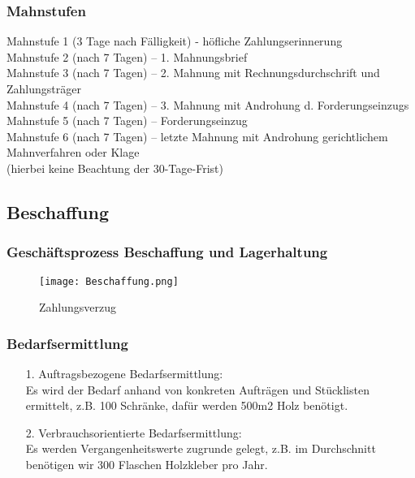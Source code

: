 \documentclass[asp1.tex]{subfiles}
\begin{document}
\subsubsection{Mahnstufen}
Mahnstufe 1 (3 Tage nach Fälligkeit) - höfliche Zahlungserinnerung\\
Mahnstufe 2 (nach 7 Tagen) – 1. Mahnungsbrief\\
Mahnstufe 3 (nach 7 Tagen) – 2. Mahnung mit Rechnungsdurchschrift und Zahlungsträger\\
Mahnstufe 4 (nach 7 Tagen) – 3. Mahnung mit Androhung d. Forderungseinzugs\\
Mahnstufe 5 (nach 7 Tagen) – Forderungseinzug\\
Mahnstufe 6 (nach 7 Tagen) – letzte Mahnung mit Androhung gerichtlichem\\
Mahnverfahren oder Klage\\
(hierbei keine Beachtung der 30-Tage-Frist)\\\textbf{}

\subsection{Beschaffung}
\subsubsection {Geschäftsprozess Beschaffung und Lagerhaltung}
\begin{figure}[H]
    \begin{center}
        \texttt{[image: Beschaffung.png]}
    \end{center}
    \caption{Zahlungsverzug}
\end{figure}

\subsubsection{Bedarfsermittlung}
\begin{itemize}
    \item[1.] Auftragsbezogene Bedarfsermittlung: \\
          Es wird der Bedarf anhand von konkreten Aufträgen und Stücklisten ermittelt, z.B. 100 Schränke, dafür werden 500m2 Holz benötigt.
    \item[2.] Verbrauchsorientierte Bedarfsermittlung: \\
          Es werden Vergangenheitswerte zugrunde gelegt, z.B. im Durchschnitt benötigen wir 300 Flaschen Holzkleber pro Jahr.
\end{itemize}
\end{document}
